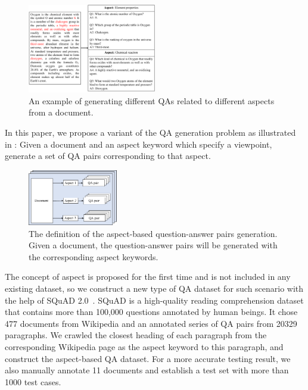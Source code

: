 \begin{figure}[th]
    \centering
    \includegraphics[width=0.5\textwidth]{pic/example.pdf}
    \caption{\label{fig:example} An example of generating different QAs related to different aspects from a document. }
\end{figure}



In this paper, we propose a variant of the QA generation problem as
illustrated in :
Given a document and an aspect keyword which specify a viewpoint, 
generate a set of QA pairs corresponding to that aspect.
\begin{figure}[th]
    \centering
    \includegraphics[width=0.35\textwidth]{pic/process.pdf}
    \caption{\label{fig:process} The definition of the aspect-based 
question-answer pairs generation. 
Given a document, the question-answer pairs will be generated 
with the corresponding aspect keywords. 
} 
\end{figure}
The concept of aspect is proposed for the first time and is not included in any existing dataset, so we construct a new type of QA dataset for such scenario with the help of 
SQuAD 2.0~\cite{rajpurkar2018know}. 
SQuAD is a high-quality reading comprehension dataset that contains more than 100,000 questions annotated by human beings. 
It chose 477 documents from Wikipedia and an annotated series of QA pairs from 20329 paragraphs.
We crawled the closest heading of each paragraph from the corresponding Wikipedia page as the aspect keyword to this paragraph, and construct the aspect-based QA dataset. For a more accurate testing result, we also manually annotate 11 documents and establish a test set with more than 1000 test cases. 

